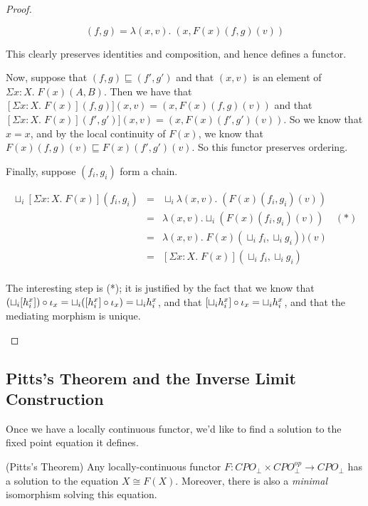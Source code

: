 \begin{proof}
\begin{enumerate}
\begin{displaymath}
  [\Sigma x:X.\; F(x)](f,g) = \lambda (x, v).\; (x, F(x)(f,g)(v))
\end{displaymath}

This clearly preserves identities and composition, and hence defines
a functor. 

Now, suppose that $(f,g) \sqsubseteq (f',g')$ and that $(x,v)$ is
an element of $\Sigma x:X.\; F(x)(A,B)$. Then we have that
$[\Sigma x:X.\;F(x)](f,g)](x,v) = (x,F(x)(f,g)(v))$ and that
$[\Sigma x:X.\;F(x)](f',g')](x,v) = (x,F(x)(f',g')(v))$. So we
know that $x=x$, and by the local continuity of $F(x)$, we know
that $F(x)(f,g)(v) \sqsubseteq F(x)(f',g')(v)$. So this functor
preserves ordering. 

Finally, suppose $(f_i, g_i)$ form a chain. 

\begin{displaymath}
\begin{array}{lcl}
\sqcup_i [\Sigma x:X.\;F(x)](f_i,g_i) 
& = & \sqcup_i \lambda (x,v).\; (F(x)(f_i,g_i)(v)) \\
& = & \lambda (x,v). \sqcup_i (F(x)(f_i,g_i)(v)) \;\;\;\; (*) \\
& = & \lambda (x,v).\; F(x)(\sqcup_i f_i, \sqcup_i g_i))(v) \\
& = & [\Sigma x:X.\;F(x)](\sqcup_i f_i, \sqcup_i g_i) \\
\end{array}
\end{displaymath}

The interesting step is (*); it is justified by the fact
that we know that 
$(\sqcup_i [h^x_i]) \circ \iota_{x} =  
\sqcup_i ([h^x_i] \circ \iota_{x}) =  \sqcup_i h^x_i$, 
and that $[\sqcup_i h^x_i] \circ \iota_{x} = \sqcup_i h^x_i$, 
and that the mediating morphism is unique.
\end{enumerate}
\end{proof}

\subsection{Pitts's Theorem and the Inverse Limit Construction}

Once we have a locally continuous functor, we'd like to find a
solution to the fixed point equation it defines. 

\begin{prop}{(Pitts's Theorem)}
Any locally-continuous functor $F : CPO_\bot \times CPO^{op}_\bot \to
CPO_\bot$ has a solution to the equation $X \cong F(X)$. Moreover, there
is also a \emph{minimal} isomorphism solving this equation. 
\end{prop}

